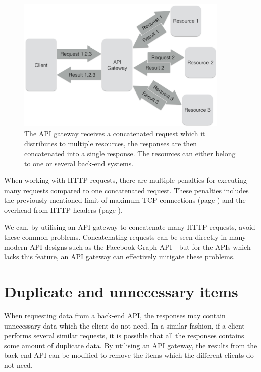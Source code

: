 \documentclass{cslthse-msc}
\begin{document}
\begin{figure}[H]
  \centering
    \begin{center}
      \includegraphics[width=0.9\textwidth]{images/api_gateway_concatenation.png}
    \end{center}
  \caption{The API gateway receives a concatenated request which it distributes to multiple resources, the responses are then concatenated into a single response. The resources can either belong to one or several back-end systems.}
\end{figure}

When working with HTTP requests, there are multiple penalties for executing many requests compared to one concatenated request. These penalties includes the previously mentioned limit of maximum TCP connections (page \pageref{max_tcp}) and the overhead from HTTP headers (page \pageref{headers}). 

We can, by utilising an API gateway to concatenate many HTTP requests, avoid these common problems. Concatenating requests can be seen directly in many modern API designs such as the Facebook Graph API\cite{facebook_batch_requests}---but for the APIs which lacks this feature, an API gateway can effectively mitigate these problems.

\section{Duplicate and unnecessary items}
When requesting data from a back-end API, the responses may contain unnecessary data which the client do not need. In a similar fashion, if a client performs several similar requests, it is possible that all the responses contains some amount of duplicate data. By utilising an API gateway, the results from the back-end API can be modified to remove the items which the different clients do not need.
\end{document}

